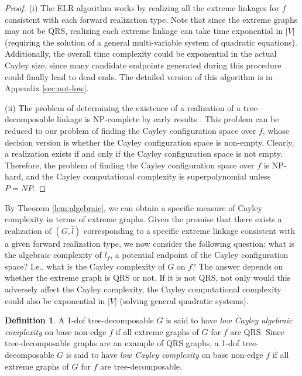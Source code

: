 \documentclass[secthm,amsthm,english]{article}
\theoremstyle{definition}
\newtheorem{definition}{Definition}
\theoremstyle{remark}
\begin{document}
\begin{proof}
(i) The ELR algorithm works by realizing all the extreme linkages for $f$ consistent with each forward realization type. 
Note that since the extreme graphs may not be QRS, realizing each extreme linkage can take time exponential in $|V|$ 
(requiring the solution of a general multi-variable system of quadratic equations).
Additionally, the overall time complexity could be exponential in the actual Cayley size, 
since many candidate endpoints generated during this procedure could finally lead to dead ends. 
The detailed version of this algorithm is in Appendix \ref{sec:not-low}. 



(ii) The problem of determining the existence of a realization of a tree-decomposable linkage 
is NP-complete by early results \cite{bib:saxe79}. This problem can be reduced to our problem of finding the Cayley configuration space over $f$, 
whose decision version is whether the Cayley configuration space is non-empty. 
Clearly, a realization exists if and only if the Cayley configuration space is not empty. 
Therefore, the problem of finding the Cayley configuration space over $f$ is NP-hard, and the Cayley computational complexity is superpolynomial unless $P = NP$.
\end{proof}



By Theorem \ref{lem:algebraic}, we can obtain a specific measure of Cayley complexity in terms of extreme graphs. 
Given the promise that there exists a realization of $(G,\bar{l})$ corresponding to 
a specific extreme linkage  consistent with a given forward realization type, 
we now consider the following question: 
what is the algebraic complexity of $l_f$, a potential endpoint of the Cayley configuration space?
I.e., what is the Cayley complexity of $G$ on $f$? 
The answer depends on whether the extreme graph is QRS or not. 
If it is not QRS, not only would this adversely affect the Cayley complexity, 
the Cayley computational complexity could also be exponential in $|V|$  
(solving general quadratic systems). 

\begin{definition}\label{def:low}A 1-dof tree-decomposable $G$ is said to have {\emph{low Cayley algebraic complexity}} on base non-edge $f$ if all  extreme graphs of $G$ for $f$ are QRS. 
Since tree-decomposable graphs are an example of QRS graphs, 
a 1-dof tree-decomposable $G$ is said to have {\emph{low Cayley complexity}} on base non-edge $f$ if all  extreme graphs of $G$ for $f$ are tree-decomposable. 
\end{definition}
\end{document}
